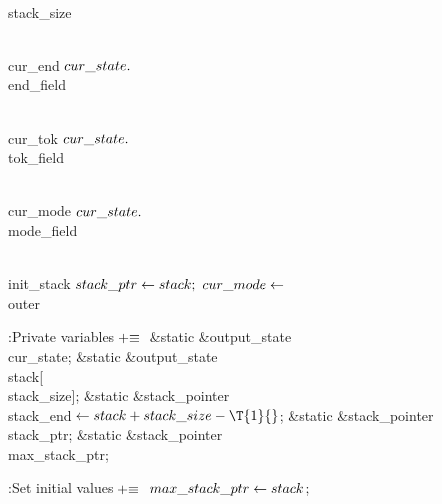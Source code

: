 \B\D\\{stack\_size}\5
\par
\B\4\D\\{cur\_end}\5
$\\{cur\_state}.{}$\\{end\_field}\par
\B\4\D\\{cur\_tok}\5
$\\{cur\_state}.{}$\\{tok\_field}\par
\B\4\D\\{cur\_mode}\5
$\\{cur\_state}.{}$\\{mode\_field}\par
\B\4\D\\{init\_stack}\5
$\\{stack\_ptr}\leftarrow\\{stack};$ $\\{cur\_mode}\leftarrow{}$\\{outer}\par
\Y\B\4:Private variables\X${}\mathrel+\equiv{}$\6
\&{static} \&{output\_state} \\{cur\_state};\6
\&{static} \&{output\_state} \\{stack}[\\{stack\_size}];\6
\&{static} \&{stack\_pointer} \\{stack\_end}${}\K\\{stack}+\\{stack\_size}-%
\T{1}{}$;\6
\&{static} \&{stack\_pointer} \\{stack\_ptr};\6
\&{static} \&{stack\_pointer} \\{max\_stack\_ptr};\par
\fi

\B{}:Set initial values\X${}\mathrel+\equiv{}$\6
$\\{max\_stack\_ptr}\leftarrow\\{stack}{}$;\par
\fi

